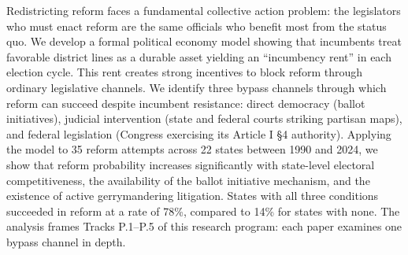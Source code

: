 Redistricting reform faces a fundamental collective action problem: the legislators who must enact reform are the same officials who benefit most from the status quo. We develop a formal political economy model showing that incumbents treat favorable district lines as a durable asset yielding an ``incumbency rent'' in each election cycle. This rent creates strong incentives to block reform through ordinary legislative channels. We identify three bypass channels through which reform can succeed despite incumbent resistance: direct democracy (ballot initiatives), judicial intervention (state and federal courts striking partisan maps), and federal legislation (Congress exercising its Article I \S4 authority). Applying the model to 35 reform attempts across 22 states between 1990 and 2024, we show that reform probability increases significantly with state-level electoral competitiveness, the availability of the ballot initiative mechanism, and the existence of active gerrymandering litigation. States with all three conditions succeeded in reform at a rate of 78\%, compared to 14\% for states with none. The analysis frames Tracks P.1--P.5 of this research program: each paper examines one bypass channel in depth.
